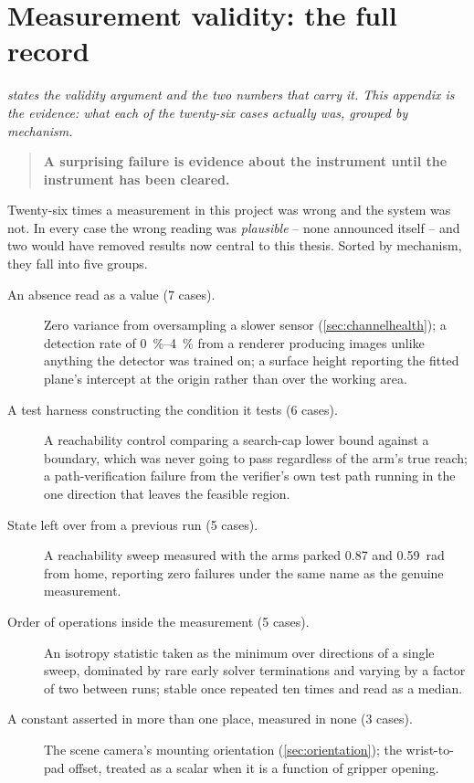 \chapter{Measurement validity: the full record}
\label{app:instrument}
\label{ch:instrument}

\noindent\emph{ states the validity argument and the
two numbers that carry it. This appendix is the evidence: what each of the
twenty-six cases actually was, grouped by mechanism.}

\begin{quote}
\textbf{A surprising failure is evidence about the instrument until the
instrument has been cleared.}
\end{quote}

Twenty-six times a measurement in this project was wrong and the system was
not. In every case the wrong reading was \emph{plausible} -- none announced
itself -- and two would have removed results now central to this thesis.
Sorted by mechanism, they fall into five groups.

\begin{description}
  \item[An absence read as a value (7 cases).] Zero variance from
    oversampling a slower sensor (\cref{sec:channelhealth}); a detection
    rate of \SIrange{0}{4}{\percent} from a renderer producing images
    unlike anything the detector was trained on; a surface height reporting
    the fitted plane's intercept at the origin rather than over the working
    area.
  \item[A test harness constructing the condition it tests (6 cases).] A
    reachability control comparing a search-cap lower bound against a
    boundary, which was never going to pass regardless of the arm's true
    reach; a path-verification failure from the verifier's own test path
    running in the one direction that leaves the feasible region.
  \item[State left over from a previous run (5 cases).] A reachability
    sweep measured with the arms parked \SI{0.87}{} and \SI{0.59}{\radian}
    from home, reporting zero failures under the same name as the
    genuine measurement.
  \item[Order of operations inside the measurement (5 cases).] An isotropy
    statistic taken as the minimum over directions of a single sweep,
    dominated by rare early solver terminations and varying by a factor of
    two between runs; stable once repeated ten times and read as a median.
  \item[A constant asserted in more than one place, measured in none (3
    cases).] The scene camera's mounting orientation
    (\cref{sec:orientation}); the wrist-to-pad offset, treated as a scalar
    when it is a function of gripper opening.
\end{description}

